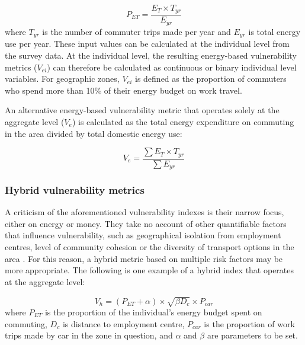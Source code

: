 \begin{equation}
P_{ET} = \frac{E_T \times T_{yr}}{E_{yr}}
\label{e:pet}
\end{equation}
where $T_{yr}$ is the number of commuter trips made per year and $E_{yr}$ is
total energy use per year. These input values can be calculated at the
individual level from the survey data.
At the individual level, the resulting energy-based vulnerability metrics
($V_{ei}$) can therefore be calculated as continuous or binary individual level
variables. For geographic zones, $V_{ei}$ is defined as the proportion of
commuters who spend more than 10\% of their energy budget on work travel.

An alternative energy-based vulnerability metric that operates solely at the
aggregate level ($V_e$) is calculated as the total energy expenditure on
commuting in the area divided by total domestic energy use:

\begin{equation}
 V_e = \frac{ \sum E_T \times T_{yr}} {\sum E_{yr}}
\end{equation}

\subsubsection{Hybrid vulnerability metrics}
A criticism of the aforementioned vulnerability indexes is their narrow focus,
either on energy or money. They take no account of other quantifiable factors
that influence vulnerability, such as geographical isolation from employment
centres, level of community cohesion or the diversity of transport
options in the area \citep{Pickerill2008,
North2010585, Steele2010mind, newman2009resilient}.
For this reason, a hybrid metric based on multiple risk
factors may be more appropriate. The following is one example of a hybrid
index that operates at the aggregate level:

\begin{equation}
 V_h = (P_{ET} + \alpha) \times \sqrt{\beta D_{c}} \times P_{car}
\label{e:ev}
\end{equation}
where $P_{ET}$ is the proportion of the individual's energy budget spent on
commuting, $D_{c}$ is distance to employment centre, $P_{car}$ is the proportion
of work trips made by car in the zone in question, and $\alpha$ and $\beta$ are
parameters to be set.

